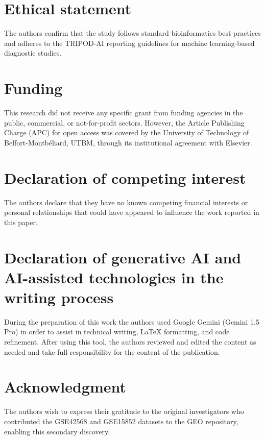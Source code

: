 \documentclass[a4paper,fleqn]{cas-dc}
\begin{document}
\section*{Ethical statement}
The authors confirm that the study follows standard bioinformatics best practices and adheres to the TRIPOD-AI reporting guidelines for machine learning-based diagnostic studies.

\section*{Funding}
This research did not receive any specific grant from funding agencies in the public, commercial, or not-for-profit sectors. However, the Article Publishing Charge (APC) for open access was covered by the University of Technology of Belfort-Montb\'eliard, UTBM, through its institutional agreement with Elsevier.

\printcredits

\section*{Declaration of competing interest}
The authors declare that they have no known competing financial interests or personal relationships that could have appeared to influence the work reported in this paper.

\section*{Declaration of generative AI and AI-assisted technologies in the writing process}
During the preparation of this work the authors used Google Gemini (Gemini 1.5 Pro) in order to assist in technical writing, LaTeX formatting, and code refinement. After using this tool, the authors reviewed and edited the content as needed and take full responsibility for the content of the publication.

\section*{Acknowledgment}
The authors wish to express their gratitude to the original investigators who contributed the GSE42568 and GSE15852 datasets to the GEO repository, enabling this secondary discovery.
\end{document}
